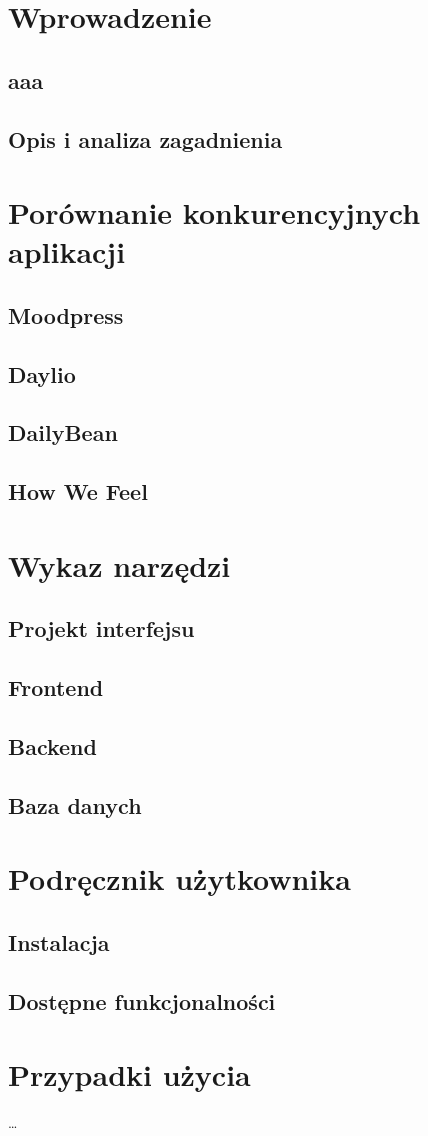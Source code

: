 \documentclass[inz, shortabstract]{iithesis}
\author         {Aleksandra Nicpoń \and Martyna Wybraniec}
\begin{document}

\chapter{Wprowadzenie}
\section{aaa}
\section{Opis i analiza zagadnienia}
\chapter{Porównanie konkurencyjnych aplikacji}
\section{Moodpress}
\section{Daylio}
\section{DailyBean}
\section{How We Feel}
\chapter{Wykaz narzędzi}
\section{Projekt interfejsu}
\section{Frontend}
\section{Backend}
\section{Baza danych}
\chapter{Podręcznik użytkownika}
\section{Instalacja}
\section{Dostępne funkcjonalności}
\chapter{Przypadki użycia}

\ldots


\end{document}
